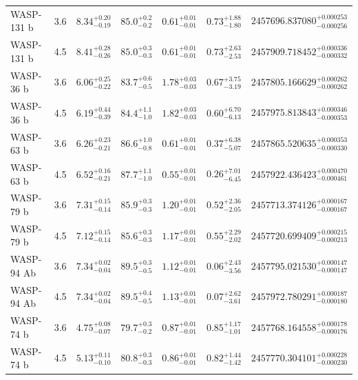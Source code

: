{\begin{longtable}[h]{lllllll}
WASP-131 b  &               3.6 &   ${8.34}^{+0.20}_{-0.19}$ &  ${85.0}^{+0.2}_{-0.2}$ &  ${0.61}^{+0.01}_{-0.01}$ &    ${0.73}^{+1.88}_{-1.80}$ &  ${2457696.837080}^{+0.000253}_{-0.000256}$ \\
WASP-131 b  &               4.5 &   ${8.41}^{+0.28}_{-0.26}$ &  ${85.0}^{+0.3}_{-0.3}$ &  ${0.61}^{+0.01}_{-0.01}$ &    ${0.73}^{+2.63}_{-2.53}$ &  ${2457909.718452}^{+0.000336}_{-0.000332}$ \\
WASP-36 b   &               3.6 &   ${6.06}^{+0.25}_{-0.22}$ &  ${83.7}^{+0.6}_{-0.5}$ &  ${1.78}^{+0.03}_{-0.03}$ &    ${0.67}^{+3.75}_{-3.19}$ &  ${2457805.166629}^{+0.000262}_{-0.000262}$ \\
WASP-36 b   &               4.5 &   ${6.19}^{+0.44}_{-0.39}$ &  ${84.4}^{+1.1}_{-1.0}$ &  ${1.82}^{+0.03}_{-0.03}$ &    ${0.60}^{+6.70}_{-6.13}$ &  ${2457975.813843}^{+0.000346}_{-0.000353}$ \\
WASP-63 b   &               3.6 &   ${6.26}^{+0.23}_{-0.21}$ &  ${86.6}^{+1.0}_{-0.8}$ &  ${0.61}^{+0.01}_{-0.01}$ &    ${0.37}^{+6.38}_{-5.07}$ &  ${2457865.520635}^{+0.000353}_{-0.000330}$ \\
WASP-63 b   &               4.5 &   ${6.52}^{+0.16}_{-0.21}$ &  ${87.7}^{+1.1}_{-1.0}$ &  ${0.55}^{+0.01}_{-0.01}$ &    ${0.26}^{+7.01}_{-6.45}$ &  ${2457922.436423}^{+0.000470}_{-0.000461}$ \\
WASP-79 b   &               3.6 &   ${7.31}^{+0.15}_{-0.14}$ &  ${85.9}^{+0.3}_{-0.3}$ &  ${1.20}^{+0.01}_{-0.01}$ &    ${0.52}^{+2.36}_{-2.05}$ &  ${2457713.374126}^{+0.000167}_{-0.000167}$ \\
WASP-79 b   &               4.5 &   ${7.12}^{+0.15}_{-0.14}$ &  ${85.6}^{+0.3}_{-0.3}$ &  ${1.17}^{+0.01}_{-0.01}$ &    ${0.55}^{+2.29}_{-2.02}$ &  ${2457720.699409}^{+0.000215}_{-0.000213}$ \\
WASP-94 Ab  &               3.6 &   ${7.34}^{+0.02}_{-0.04}$ &  ${89.5}^{+0.3}_{-0.5}$ &  ${1.12}^{+0.01}_{-0.01}$ &    ${0.06}^{+2.43}_{-3.56}$ &  ${2457795.021530}^{+0.000147}_{-0.000147}$ \\
WASP-94 Ab  &               4.5 &   ${7.34}^{+0.02}_{-0.04}$ &  ${89.5}^{+0.4}_{-0.5}$ &  ${1.13}^{+0.01}_{-0.01}$ &    ${0.07}^{+2.62}_{-3.61}$ &  ${2457972.780291}^{+0.000187}_{-0.000180}$ \\
WASP-74 b   &               3.6 &   ${4.75}^{+0.08}_{-0.07}$ &  ${79.7}^{+0.3}_{-0.2}$ &  ${0.87}^{+0.01}_{-0.01}$ &    ${0.85}^{+1.17}_{-1.01}$ &  ${2457768.164558}^{+0.000178}_{-0.000176}$ \\
WASP-74 b   &               4.5 &   ${5.13}^{+0.11}_{-0.10}$ &  ${80.8}^{+0.3}_{-0.3}$ &  ${0.86}^{+0.01}_{-0.01}$ &    ${0.82}^{+1.44}_{-1.42}$ &  ${2457770.304101}^{+0.000228}_{-0.000230}$ \\

\end{longtable}}
